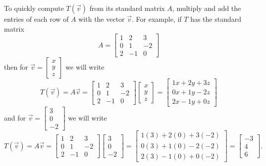 \begin{fact}
  To quickly compute \(T(\vec v)\) from its standard matrix \(A\),
  multiply and add the entries of each row of \(A\) with the vector \(\vec v\).
  For example, if \(T\) has the standard matrix
  \[
    A = \begin{bmatrix} 1 & 2 & 3 \\ 0 & 1 & -2 \\ 2 & -1 & 0 \end{bmatrix}
  \]
  then for \(\vec v=\begin{bmatrix}x\\y\\z\end{bmatrix}\) we will write
  \[
    T(\vec v)
      =
    A\vec v
      =
    \begin{bmatrix} 1 & 2 & 3 \\ 0 & 1 & -2 \\ 2 & -1 & 0 \end{bmatrix}
    \begin{bmatrix}x\\y\\z\end{bmatrix}
      =
    \begin{bmatrix}
      1x+2y+3z\\
      0x+1y-2z\\
      2x-1y+0z
    \end{bmatrix}
  \]
  and for \(\vec v=\begin{bmatrix}3\\0\\-2\end{bmatrix}\) we will write
  \[
    T(\vec v)
      =
    A\vec v
      =
    \begin{bmatrix} 1 & 2 & 3 \\ 0 & 1 & -2 \\ 2 & -1 & 0 \end{bmatrix}
    \begin{bmatrix}3\\0\\-2\end{bmatrix}
      =
    \begin{bmatrix}
      1(3)+2(0)+3(-2)\\
      0(3)+1(0)-2(-2)\\
      2(3)-1(0)+0(-2)
    \end{bmatrix}
      =
    \begin{bmatrix}
      -3\\
      4\\
      6
    \end{bmatrix}
  .\]
\end{fact}

